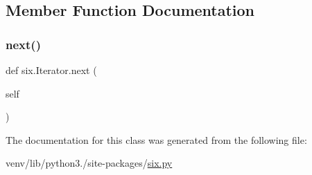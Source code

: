 \subsection{Member Function Documentation}
\mbox{\label{classsix_1_1Iterator_a2248c904e3068509258d20d89c2d64fd}} 
\subsubsection{\texorpdfstring{next()}{next()}}
{\footnotesize\ttfamily def six.\+Iterator.\+next (\begin{DoxyParamCaption}\item[{}]{self }\end{DoxyParamCaption})}



The documentation for this class was generated from the following file\+:\begin{DoxyCompactItemize}
\item 
venv/lib/python3./site-\/packages/\hyperlink{six_8py}{six.\+py}\end{DoxyCompactItemize}
